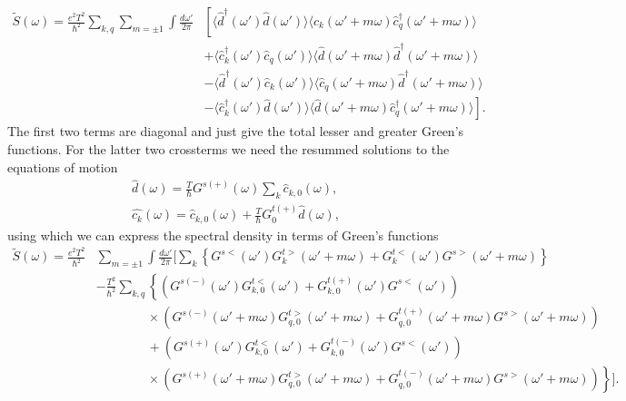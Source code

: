 \begin{align}
    \tilde{S}(\omega) = \frac{e^2T^2}{\hbar^2}\sum_{k,q}\sum_{m=\pm1}\int\frac{d\omega'}{2\pi}&\left[\langle\hat{d}^\dagger(\omega')\hat{d}(\omega')\rangle\langle\hat{c}_k(\omega'+m\omega)\hat{c}_q^\dagger(\omega'+m\omega)\rangle\right.\nonumber\\ 
    &\left.+ \langle\hat{c}_k^\dagger(\omega')\hat{c}_q(\omega')\rangle\langle\hat{d}(\omega'+m\omega)\hat{d}^\dagger(\omega'+m\omega)\rangle\right.\nonumber\\ 
    &\left.- \langle\hat{d}^\dagger(\omega')\hat{c}_k(\omega')\rangle\langle\hat{c}_q(\omega'+m\omega)\hat{d}^\dagger(\omega'+m\omega)\rangle\right.\nonumber\\
    &\left.- \langle\hat{c}_k^\dagger(\omega')\hat{d}(\omega')\rangle\langle\hat{d}(\omega'+m\omega)\hat{c}_q^\dagger(\omega'+m\omega)\rangle\right].
\end{align}
The first two terms are diagonal and just give the total lesser and greater Green's functions. For the latter two crossterms we need the resummed solutions to the equations of motion
\begin{gather}
    \hat{d}(\omega) = \frac{T}{\hbar}G^{s(+)}(\omega)\sum_k\hat{c}_{k,0}(\omega),\\
    \hat{c_k}(\omega) = \hat{c}_{k,0}(\omega) + \frac{T}{\hbar}G^{t(+)}_0\hat{d}(\omega),
\end{gather}
using which we can express the spectral density in terms of Green's functions
\begin{align}
    \tilde{S}(\omega) = \frac{e^2T^2}{\hbar^2}&\sum_{m=\pm1}\int\frac{d\omega'}{2\pi}\biggl[\sum_k \left\{G^{s<}(\omega')G^{t>}_k(\omega'+m\omega) + G^{t<}_k(\omega')G^{s>}(\omega'+m\omega)\right\}\nonumber\\
    & -\frac{T^2}{\hbar^2}\sum_{k,q}\left\{\left(G^{s(-)}(\omega')G^{t<}_{k,0}(\omega')+G^{t(+)}_{k,0}(\omega')G^{s<}(\omega')\right)\right.\nonumber\\
    &\left.\qquad\qquad\times\left(G^{s(-)}(\omega'+m\omega)G^{t>}_{q,0}(\omega'+m\omega)+G^{t(+)}_{q,0}(\omega'+m\omega)G^{s>}(\omega'+m\omega)\right)\nonumber\right.\\
    &\left.\qquad\qquad+\left(G^{s(+)}(\omega')G^{t<}_{k,0}(\omega')+G^{t(-)}_{k,0}(\omega')G^{s<}(\omega')\right)\right.\nonumber\\
    &\left.\qquad\qquad\times\left(G^{s(+)}(\omega'+m\omega)G^{t>}_{q,0}(\omega'+m\omega)+G^{t(-)}_{q,0}(\omega'+m\omega)G^{s>}(\omega'+m\omega)\right)\right\}\biggr].
\end{align}
